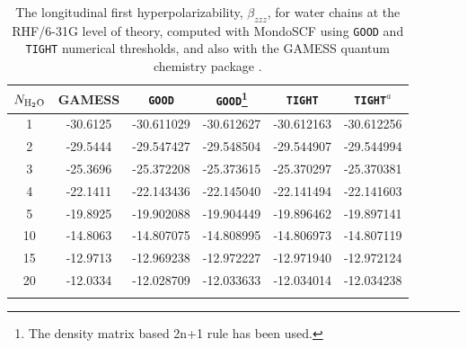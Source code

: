 \documentclass[prl,aps,preprint,showpacs,superbib]{revtex4}
\begin{document}
{\begin{table}[h]
  \centering
  \caption{\protect
    The longitudinal first hyperpolarizability, $\beta_{zzz}$,
    for water chains at the RHF/6-31G level of theory, computed with 
    {\sc MondoSCF} using {\tt GOOD} and {\tt TIGHT} numerical thresholds, 
    and also with the {\sc GAMESS} quantum chemistry package \cite{gamess}.
  }\label{tab:Beta_1D_Values}
  \begin{tabular}{cccccc}
    \toprule
    $N_{\rm H_2 O}$ &\multicolumn{1}{c}{{\sc GAMESS}}
    &\multicolumn{1}{c}{{\tt GOOD}}
    &\multicolumn{1}{c}{{\tt GOOD}\footnote[1]{The density matrix based 2n+1 rule has been used.}}
    &\multicolumn{1}{c}{{\tt TIGHT}}
    &\multicolumn{1}{c}{{\tt TIGHT}$^a$} \\
    \hline
     1 & -30.6125 & -30.611029 & -30.612627 & -30.612163 & -30.612256 \\
     2 & -29.5444 & -29.547427 & -29.548504 & -29.544907 & -29.544994 \\
     3 & -25.3696 & -25.372208 & -25.373615 & -25.370297 & -25.370381 \\
     4 & -22.1411 & -22.143436 & -22.145040 & -22.141494 & -22.141603 \\
     5 & -19.8925 & -19.902088 & -19.904449 & -19.896462 & -19.897141 \\
    10 & -14.8063 & -14.807075 & -14.808995 & -14.806973 & -14.807119 \\
    15 & -12.9713 & -12.969238 & -12.972227 & -12.971940 & -12.972124 \\
    20 & -12.0334 & -12.028709 & -12.033633 & -12.034014 & -12.034238 \\
    \botrule
  \end{tabular}
\end{table}

}
\end{document}
